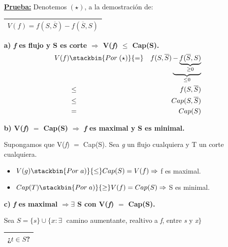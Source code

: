\documentclass[12pt,a4paper]{report}
\begin{document}
		\textbf{\underline{Prueba:}} Denotemos $(\star)$, a la demostración de:
			\begin{center}
				\begin{tabular}{|c|} \hline $V(\textit{f}) = f(S, \overline{S}) - f(\overline{S},S)$ \\\hline \end{tabular}
			\end{center}

			\vspace{5mm}
			\textbf{a) \textit{f} es flujo y S es corte $\Rightarrow$ V(\textit{f}) $\leq$ Cap(S).}
				\begin{eqnarray}
					\nonumber V(f) &\stackbin{Por \; (\star)}{=}& f(S, \overline{S})\underbrace{-\underbrace{f(\overline{S}, S)}_{\geq 0}}_{\leq 0} \\
					\nonumber &\leq & f(S, \overline{S}) \\
					\nonumber &\leq & Cap(S, \overline{S}) \\
					\nonumber &=& Cap(S)
				\end{eqnarray}

			\textbf{b) V(\textit{f}) $=$ Cap(S) $\Rightarrow$ \textit{f} es maximal y S es minimal.}

				\vspace{2mm}
				\par Supongamos que V(\textit{f}) $=$ Cap(S). Sea \textit{g} un flujo cualquiera y T un corte cualquiera.
				\pagebreak
				\begin{itemize}
					\item $V(g) \stackbin{Por \; a)}{\leq} Cap(S) = V(f) \Rightarrow$ f es maximal.
					\item $Cap(T) \stackbin{Por \; a)}{\geq} V(f) = Cap(S) \Rightarrow$ S es minimal.
				\end{itemize}

			\vspace{5mm}
			\textbf{c) \textit{f} es maximal $\Rightarrow \exists$ S con V(\textit{f}) $=$ Cap(S).}

				\vspace{2mm}
				\par Sea $S = \{s\} \cup \{x : \exists \;$ camino aumentante, realtivo a \textit{f}, entre \textit{s} y \textit{x}$\}$

				\vspace{5mm}
				\begin{tabular}{|c|} \hline ¿$t \in S$? \\\hline \end{tabular}
\end{document}

